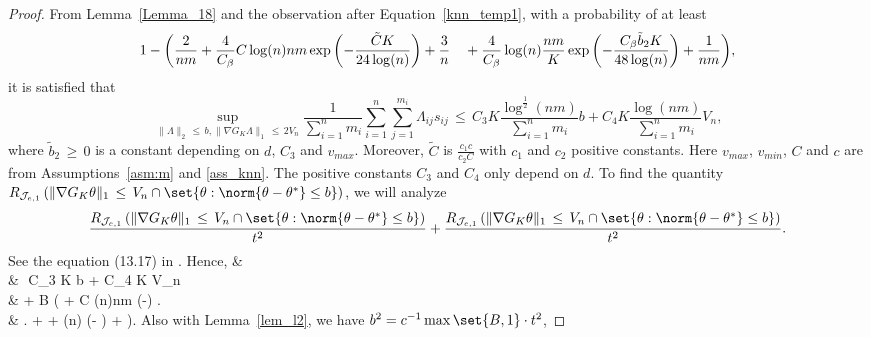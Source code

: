 \documentclass[twoside,11pt]{article}
\begin{document}
\begin{proof}
From Lemma~\ref{Lemma_18} and the observation after Equation~\eqref{knn_temp1}, with a probability of at least
\[
1 - \bigg(\frac{2}{nm} + \frac{4}{C_{\beta}}C \log(n)nm \exp\left(-\frac{\tilde C K }{24\log(n)}\right)  + \frac{3}{n} \\
\quad + \frac{4}{C_{\beta}} \log(n) \frac{nm}{K}\exp\left(- \frac{C_{\beta} {\tilde b}_2 K}{48\log(n)}\right)  + \frac{1}{nm}\bigg),
\]
it is satisfied that
\[
\sup_{\|\varLambda\|_2 \,\leq\, b, \|\nabla{G_K} \varLambda\|_1 \,\leq\, 2V_n} \frac{1}{\sum_{i = 1}^n m_i}\sum_{i = 1}^n  \sum_{j=1}^{m_{i}} \varLambda_{ij}s_{ij}
\,\leq\, C_3  K \frac{\log^{\frac{1}{2}}(nm)}{\sum_{i = 1}^n  m_i}b + C_4  K \frac{\log(nm)}{\sum_{i = 1}^n  m_i}V_n,
\]
where \( \tilde b_2 \,\geq\, 0 \) is a constant depending on \( d \), \( C_3 \) and \( v_{max} \). Moreover, \( \tilde C \) is \( \frac{c_1c}{c_2C} \) with \( c_1 \) and \( c_2 \) positive constants.
Here \( v_{max} \), \( v_{min} \), \( C \) and \( c \) are from Assumptions~\ref{asm:m} and \ref{ass_knn}. The positive constants \( C_3 \) and \( C_4 \) only depend on \( d \).
To find the quantity $R_{\mathcal{J}_{e,1}}\left( \|\nabla{G_K} \theta\|_1 \,\leq\, V_n\cap \set{\theta: \norm{\theta-\theta^*} \leq  b}\right)$,  we will analyze
\[
\frac{ R_{\mathcal{J}_{e,1}}\left( \|\nabla{G_K} \theta\|_1 \,\leq\, V_n\cap \set{\theta: \norm{\theta-\theta^*} \leq  b}\right)}{t^2} \\
+ \frac{R_{\mathcal{J}_{e,1}}\left( \|\nabla{G_K} \theta\|_1 \,\leq\, V_n\cap \set{\theta: \norm{\theta-\theta^*} \leq  b}\right)}{t^2}.
\]
See the equation (13.17) in \cite{wainwright2019high}. 
Hence,
\bea 
& \\
&\,\leq\, C_3  K b + C_4  K V_n \\
& \quad +  B  \cdot \left( + C \log(n)nm \exp\left(-\right) \right. \\
& \left. \quad +  +  \log(n) \exp\left(- \right)  + \right).
\bea
Also with Lemma~\ref{lem_l2}, we have $b^2 = c^{-1}\max\set{B,1}\cdot t^2$,



\end{proof}
\end{document}
